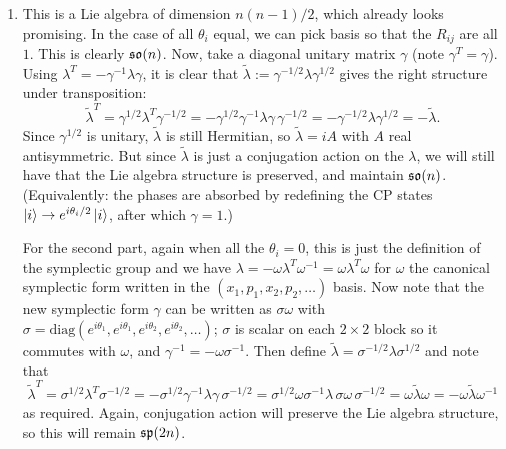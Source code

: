 \documentclass[11pt, class=article, crop=false]{standalone}
\begin{document}
\begin{enumerate}
	 \item This is a Lie algebra of dimension $n(n-1)/2$, which already looks promising. In the case of all $\theta_i$ equal, we can pick basis so that the $R_{ij}$ are all $1$. This is clearly $\frak{so}(n)$. Now, take a diagonal unitary matrix $\gamma$ (note $\gamma^T = \gamma$). Using $\lambda^T = -\gamma^{-1} \lambda \gamma$, it is clear that $\tilde \lambda := \gamma^{-1/2} \lambda \gamma^{1/2}$ gives the right structure under transposition:
	 \[
	 	\tilde \lambda^T = \gamma^{1/2} \lambda^T \gamma^{-1/2} = - \gamma^{1/2} \gamma^{-1} \lambda \gamma\, \gamma^{-1/2} = - \gamma^{-1/2} \lambda \gamma^{1/2} = - \tilde \lambda.
	 \]
	 Since $\gamma^{1/2}$ is unitary, $\tilde \lambda$ is still Hermitian, so $\tilde \lambda = i A$ with $A$ real antisymmetric. But since $\tilde \lambda$ is just a conjugation action on the $\lambda$, we will still have that the Lie algebra structure is preserved, and maintain $\frak{so}(n)$. (Equivalently: the phases are absorbed by redefining the CP states $\ket{i} \to e^{i \theta_i/2} \ket{i}$, after which $\gamma = 1$.)
	 
	 For the second part, again when all the $\theta_i = 0$, this is just the definition of the symplectic group and we have $\lambda = - \omega \lambda^T \omega^{-1} = \omega \lambda^T \omega$ for $\omega$ the canonical symplectic form written in the $(x_1, p_1, x_2, p_2, \dots)$ basis. Now note that the new symplectic form $\gamma$ can be written as $\sigma \omega$ with $\sigma = \mathrm{diag}(e^{i \theta_1}, e^{i\theta_1}, e^{i \theta_2}, e^{i\theta_2}, \dots)$; $\sigma$ is scalar on each $2 \times 2$ block so it commutes with $\omega$, and $\gamma^{-1} = -\omega \sigma^{-1}$. Then define $\tilde \lambda = \sigma^{-1/2} \lambda \sigma^{1/2}$ and note that
	 \[
	 	\tilde \lambda^T = \sigma^{1/2} \lambda^T \sigma^{-1/2} = - \sigma^{1/2} \gamma^{-1} \lambda \gamma\, \sigma^{-1/2} = \sigma^{1/2} \omega \sigma^{-1} \lambda\, \sigma \omega\, \sigma^{-1/2} = \omega \tilde \lambda \omega = - \omega \tilde \lambda \omega^{-1}
	 \]
	 as required. Again, conjugation action will preserve the Lie algebra structure, so this will remain $\frak{sp}(2n)$.
	 

\end{enumerate}
\end{document}
